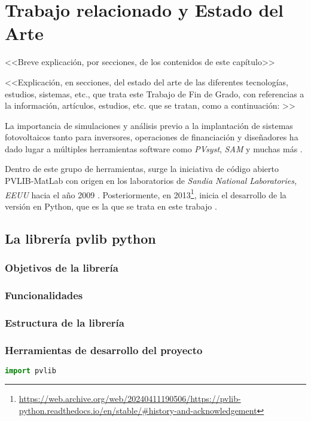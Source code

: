 \chapter{Trabajo relacionado y Estado del Arte} \label{chp:state-of-the-art}

<<Breve explicación, por secciones, de los contenidos de este capítulo>>


<<Explicación, en secciones, del estado del arte de las diferentes tecnologías, estudios, sistemas, etc., que trata este Trabajo de Fin de Grado, con referencias a la información, artículos, estudios, etc. que se tratan, como a continuación: \cite{stein_models_2009}>>

La importancia de simulaciones y análisis previo a la implantación de sistemas fotovoltaicos tanto para inversores, operaciones de financiación y diseñadores ha dado lugar a múltiples herramientas software como \textit{PVsyst}, \textit{SAM} y muchas más \cite{stein_models_2009}.

Dentro de este grupo de herramientas, surge la iniciativa de código abierto PVLIB-MatLab con origen en los laboratorios de \textit{Sandia National Laboratories, EEUU} hacia el año 2009 \cite{pvlib_history}. Posteriormente, en 2013\footnote{\url{https://web.archive.org/web/20240411190506/https://pvlib-python.readthedocs.io/en/stable/\#history-and-acknowledgement}}, inicia el desarrollo de la versión en Python, que es la que se trata en este trabajo \cite{pvlib_python}.

\section{La librería pvlib python} \label{sct:pvlib}

\subsection{Objetivos de la librería} \label{ssct:pvlib:objetivos}

\subsection{Funcionalidades} \label{ssct:pvlib:funcionalidades}

\subsection{Estructura de la librería} \label{ssct:pvlib:estructura}

\subsection{Herramientas de desarrollo del proyecto} \label{ssct:pvlib:herramientas}

\begin{lstlisting}[language=Python]
import pvlib

\end{lstlisting}
